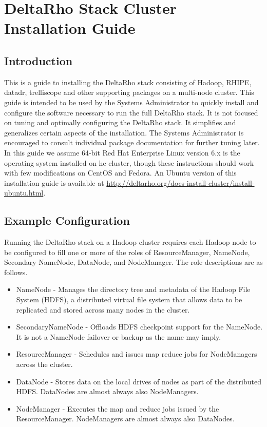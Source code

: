 \section{DeltaRho Stack Cluster Installation Guide}
\subsection{Introduction}
This is a guide to installing the DeltaRho stack consisting of
Hadoop\textregistered, RHIPE, datadr, trelliscope and other supporting
packages on a multi-node cluster.  This guide is intended to be used
by the Systems Administrator to quickly install and configure the
software necessary to run the full DeltaRho stack.  It is not focused
on tuning and optimally configuring the DeltaRho stack.  It simplifies
and generalizes certain aspects of the installation.  The Systems
Administrator is encouraged to consult individual package
documentation for further tuning later.  In this guide we assume
64-bit Red Hat Enterprise Linux version 6.x is the operating system
installed on he cluster, though these instructions should work with
few modifications on CentOS and Fedora.  An Ubuntu version of this
installation guide is available at
\url{http://deltarho.org/docs-install-cluster/install-ubuntu.html}.

\subsection{Example Configuration}
Running the DeltaRho stack on a Hadoop cluster requires each Hadoop node
to be configured to fill one or more of the roles of ResourceManager,
NameNode, Secondary NameNode, DataNode, and NodeManager. The role
descriptions are as follows.

\begin{itemize}
\item NameNode - Manages the directory tree and metadata of the Hadoop File System (HDFS), a distributed virtual file system that allows data to be replicated and stored across many nodes in the cluster.
\item SecondaryNameNode - Offloads HDFS checkpoint support for the NameNode.  It is not a NameNode failover or backup as the name may imply.
\item ResourceManager - Schedules and issues map reduce jobs for NodeManagers across the cluster.
\item DataNode - Stores data on the local drives of nodes as part of the distributed HDFS.  DataNodes are almost always also NodeManagers.
\item NodeManager - Executes the map and reduce jobs issued by the ResourceManager. NodeManagers are almost always also DataNodes.
\end{itemize}

